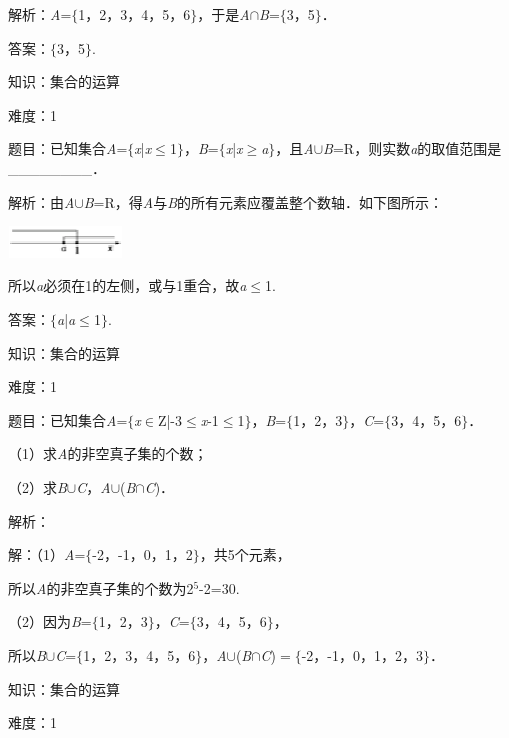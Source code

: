 \documentclass{article} %
\begin{document}
解析：\textit{A}=$\mathrm{\{}$1，2，3，4，5，6$\mathrm{\}}$，于是\textit{A}$\mathrm{\cap}$\textit{B}=$\mathrm{\{}$3，5$\mathrm{\}}$．

答案：$\mathrm{\{}$3，5$\mathrm{\}}$.

知识：集合的运算

难度：1

题目：已知集合\textit{A}=$\mathrm{\{}$\textit{x}|\textit{x}$\mathrm{\le}$1$\mathrm{\}}$，\textit{B}=$\mathrm{\{}$\textit{x}|\textit{x}$\mathrm{\ge}$\textit{a}$\mathrm{\}}$，且\textit{A}$\mathrm{\cup}$\textit{B}=R，则实数\textit{a}的取值范围是\_\_\_\_\_\_\_\_．

解析：由\textit{A}$\mathrm{\cup}$\textit{B}=R，得\textit{A}与\textit{B}的所有元素应覆盖整个数轴．如下图所示：

\includegraphics*[width=1.19in, height=0.33in, keepaspectratio=false]{image12}

所以\textit{a}必须在1的左侧，或与1重合，故\textit{a}$\mathrm{\le}$1.

答案：$\mathrm{\{}$\textit{a}|\textit{a}$\mathrm{\le}$1$\mathrm{\}}$.

知识：集合的运算

难度：1

题目：已知集合\textit{A}=$\mathrm{\{}$\textit{x}$\mathrm{\in}$Z|-3$\mathrm{\le}$\textit{x}-1$\mathrm{\le}$1$\mathrm{\}}$，\textit{B}=$\mathrm{\{}$1，2，3$\mathrm{\}}$，\textit{C}=$\mathrm{\{}$3，4，5，6$\mathrm{\}}$．

（1）求\textit{A}的非空真子集的个数；

（2）求\textit{B}$\mathrm{\cup}$\textit{C}，\textit{A}$\mathrm{\cup}$(\textit{B}$\mathrm{\cap}$\textit{C})．

解析：

解：（1）\textit{A}=$\mathrm{\{}$-2，-1，0，1，2$\mathrm{\}}$，共5个元素，

所以\textit{A}的非空真子集的个数为2${}^{5}$-2=30.

（2）因为\textit{B}=$\mathrm{\{}$1，2，3$\mathrm{\}}$，\textit{C}=$\mathrm{\{}$3，4，5，6$\mathrm{\}}$，

所以\textit{B}$\mathrm{\cup}$\textit{C}=$\mathrm{\{}$1，2，3，4，5，6$\mathrm{\}}$，\textit{A}$\mathrm{\cup}$(\textit{B}$\mathrm{\cap}$\textit{C})$=\mathrm{\{}$-2，-1，0，1，2，3$\mathrm{\}}$．

知识：集合的运算

难度：1
\end{document}
